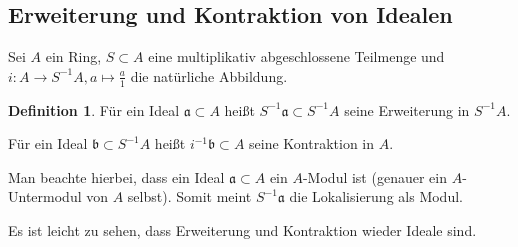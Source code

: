 \documentclass[reqno,12pt]{article}
\numberwithin{equation}{section}
\theoremstyle{plain}
\theoremstyle{definition}
\newtheorem{definition}[thm]{Definition}
\begin{document}
\subsection{Erweiterung und Kontraktion von Idealen}

Sei $A$ ein Ring, $S\subset A$ eine multiplikativ abgeschlossene Teilmenge und $i\colon A\to S^{-1}A, a\mapsto \frac{a}{1}$ die natürliche Abbildung.

\begin{definition}
Für ein Ideal $\mathfrak{a}\subset A$ heißt $S^{-1}\mathfrak{a}\subset S^{-1}A$ seine {\sf Erweiterung} in $S^{-1}A$.

Für ein Ideal $\mathfrak{b}\subset S^{-1}A$ heißt $i^{-1}\mathfrak{b}\subset A$ seine {\sf Kontraktion} in $A$.
\end{definition}

Man beachte hierbei, dass ein Ideal $\mathfrak{a}\subset A$ ein $A$-Modul ist (genauer ein $A$-Untermodul von $A$ selbst). Somit meint $S^{-1}\mathfrak{a}$ die Lokalisierung als Modul.

Es ist leicht zu sehen, dass Erweiterung und Kontraktion wieder Ideale sind.
\end{document}
